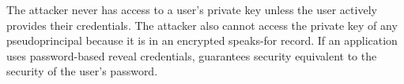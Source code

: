 %



%
%
The attacker never has access to a user's private key unless the user actively
provides their credentials.
%
The attacker also cannot access the private key of any pseudoprincipal because
it is in an encrypted speaks-for record.
%
%
If an application uses password-based reveal credentials, \sys
guarantees security equivalent to the security of the user's password.


